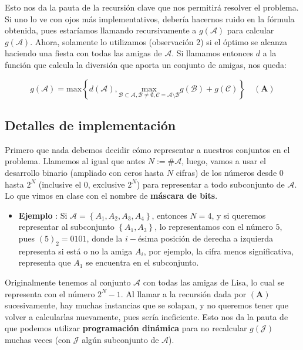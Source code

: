 Esto nos da la pauta de la recursión clave que nos permitirá resolver el problema. Si uno lo ve con ojos más implementativos, debería hacernos ruido en la fórmula obtenida, pues estaríamos llamando recursivamente a $g(\mathcal{A})$ para calcular $g(\mathcal{A})$. Ahora, solamente lo utilizamos (observación 2) si el óptimo se alcanza haciendo una fiesta con todas las amigas de $\mathcal{A}$. Si llamamos entonces $d$ a la función que calcula la diversión que aporta un conjunto de amigas, nos queda:

$$ \boxed{g(\mathcal{A}) =  \text{max} \left \{ d(\mathcal{A}),\underset{\mathcal{B} \subset \mathcal{A}, \mathcal{B} \neq \emptyset, \mathcal{C} = \mathcal{A} \setminus \mathcal{B}}{\text{max}} g(\mathcal{B}) + g(\mathcal{C}) \right \} } \quad  (\mathbf{A}) $$


\subsection*{Detalles de implementación}

Primero que nada debemos decidir cómo representar a nuestros conjuntos en el problema. Llamemos al igual que antes $ N := \# \mathcal{A}$, luego, vamos a usar el desarrollo binario (ampliado con ceros hasta $N$ cifras) de los números desde $0$ hasta $2^N$ (inclusive el $0$, exclusive $2^N$) para representar a todo subconjunto de $\mathcal{A}$. Lo que vimos en clase con el nombre de \textbf{máscara de bits}.

\begin{itemize}
	\item \textbf{Ejemplo} : Si $\mathcal{A} = \left \{ A_1, A_2, A_3, A_4 \right \}$, entonces $ N = 4$, y si queremos representar al subconjunto $ \left \{ A_1, A_3 \right \}$, lo representamos con el número $5$, pues $(5)_2 = 0101$, donde la $i-$ésima posición de derecha a izquierda representa si está o no la amiga $A_i$, por ejemplo, la cifra menos significativa, representa que $A_1$ se encuentra en el subconjunto.
\end{itemize}

Originalmente tenemos al conjunto $\mathcal{A}$ con todas las amigas de Lisa, lo cual se representa con el número $2^N-1$. Al llamar a la recursión dada por $(\mathbf{A})$ sucesivamente, hay muchas instancias que se solapan, y no queremos tener que volver a calcularlas nuevamente, pues sería ineficiente. Esto nos da la pauta de que podemos utilizar \textbf{programación dinámica} para no recalcular $g(\mathcal{J})$ muchas veces (con $\mathcal{J}$ algún subconjunto de $\mathcal{A}$).

